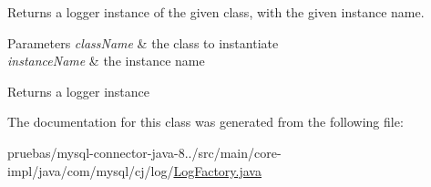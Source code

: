 Returns a logger instance of the given class, with the given instance name.


\begin{DoxyParams}{Parameters}
{\em class\+Name} & the class to instantiate \\
\hline
{\em instance\+Name} & the instance name \\
\hline
\end{DoxyParams}
\begin{DoxyReturn}{Returns}
a logger instance 
\end{DoxyReturn}


The documentation for this class was generated from the following file\+:\begin{DoxyCompactItemize}
\item 
pruebas/mysql-\/connector-\/java-\/8../src/main/core-\/impl/java/com/mysql/cj/log/\mbox{\hyperlink{_log_factory_8java}{Log\+Factory.\+java}}\end{DoxyCompactItemize}
